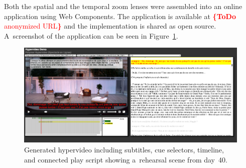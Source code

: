 \documentclass[conference]{IEEEtran}
\newcommand{\todo}[1]{\noindent\textcolor{red}{{\bf \{ToDo} #1{\bf \}}}}
\begin{document}
Both the spatial and the temporal zoom lenses were assembled into 
an online  application using Web Components. The application is available at
\todo{anonymized URL}
and the implementation is  shared as open source. A~screenshot of the application can be seen in Figure~\ref{fig:screenshot}.

\begin{figure}[htb!]
  \centering
  \includegraphics[width=0.95\linewidth]{screenshot}
  \caption{Generated hypervideo including subtitles, cue selectors, timeline, and connected play script
    showing a~rehearsal scene from day~40.}
  \label{fig:screenshot}
\end{figure}





\end{document}
